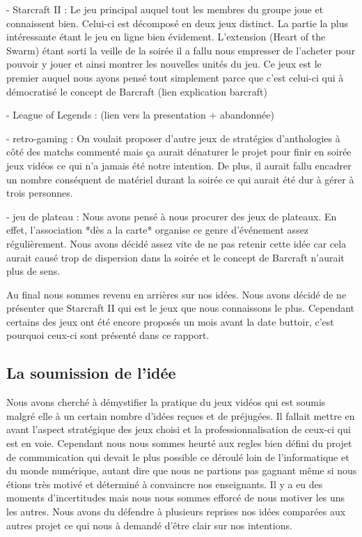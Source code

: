 - Starcraft II : Le jeu principal auquel tout les membres du groupe joue
et connaissent bien. Celui-ci est décomposé en deux jeux distinct.  La
partie la plus intéressante étant le jeu en ligne bien évidement.
L'extension (Heart of the Swarm) étant sorti la veille de la soirée il a
fallu nous empresser de l'acheter pour pouvoir y jouer et ainsi montrer
les nouvelles unités du jeu. Ce jeux est le premier auquel nous ayons
pensé tout simplement parce que c'est celui-ci qui à démocratisé le
concept de Barcraft (lien explication barcraft)

- League of Legends : (lien vers la presentation + abandonnée)

- retro-gaming : On voulait proposer d'autre jeux de stratégies
d'anthologies à côté des matchs commenté mais ça aurait dénaturer le
projet pour finir en soirée jeux vidéos ce qui n'a jamais été notre
intention. De plus, il aurait fallu encadrer un nombre conséquent de
matériel durant la soirée ce qui aurait été dur à gérer à trois
personnes.

- jeu de plateau : Nous avons pensé à nous procurer des jeux de
plateaux. En effet, l'association *dès a la carte* organise ce genre
d'événement assez régulièrement. Nous avons décidé assez vite de ne pas
retenir cette idée car cela aurait causé trop de dispersion dans la
soirée et le concept de Barcraft n'aurait plus de sens.

Au final nous sommes revenu en arrières sur nos idées. Nous avons décidé
de ne présenter que Starcraft II qui est le jeux que nous connaissons le
plus. Cependant certains des jeux ont été encore proposés un mois avant
la date buttoir, c'est pourquoi ceux-ci sont présenté dans ce rapport.


\subsection{La soumission de l'idée}%
\label{sub:la_soumission_de_leidee}

Nous avons cherché à démystifier la pratique du jeux vidéos qui est
soumis malgré elle à un certain nombre d'idées reçues et de préjugées.
Il fallait mettre en avant l'aspect stratégique des jeux choisi et la
professionnalisation de ceux-ci qui est en voie. Cependant nous nous
sommes heurté aux regles bien défini du projet de communication qui
devait le plus possible ce déroulé loin de l'informatique et du monde
numérique, autant dire que nous ne partions pas gagnant même si nous
étions très motivé et déterminé à convaincre nos enseignants. Il y a eu
des moments d'incertitudes mais nous nous sommes efforcé de nous motiver
les uns les autres. Nous avons du défendre à plusieurs reprises nos
idées comparées aux autres projet ce qui nous à demandé d'être clair sur
nos intentions.


